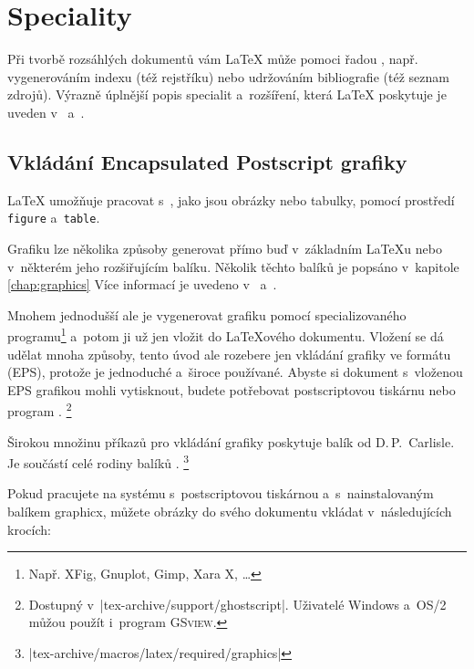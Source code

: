  
\chapter{Speciality}
\begin{intro}
  Při tvorbě rozsáhlých dokumentů vám \LaTeX{} může pomoci
  řadou , např. vygenerováním indexu (též rejstříku) nebo
  udržováním bibliografie (též seznam zdrojů). Výrazně úplnější popis specialit
  a~rozšíření, která \LaTeX{} poskytuje je uveden
v~{\normalfont\manual{}} a~{\normalfont \companion}.
\end{intro}

\section{Vkládání Encapsulated Postscript grafiky}\label{eps}
\LaTeX{} umožňuje pracovat s~, jako jsou
obrázky nebo tabulky, pomocí prostředí \texttt{figure}
a~\texttt{table}.

Grafiku lze několika způsoby generovat přímo buď
v~základním \LaTeX u nebo v~některém jeho rozšiřujícím
balíku. Několik těchto balíků je popsáno v~kapitole
\ref{chap:graphics} Více informací je uvedeno
v~\companion{} a~\manual{}.

Mnohem jednodušší ale je vygenerovat grafiku pomocí specializovaného
programu\footnote{Např. XFig, Gnuplot, Gimp, Xara X, \ldots} a~potom
ji už jen vložit do \LaTeX ového dokumentu. Vložení se dá udělat
mnoha způsoby, tento úvod ale rozebere jen vkládání grafiky ve formátu
\EPSi{} (EPS), protože je jednoduché a~široce používané. Abyste
si dokument s~vloženou EPS grafikou mohli vytisknout, budete
potřebovat postscriptovou tiskárnu nebo program \textsc{}.%
\footnote{Dostupný v~\CTANalt|tex-archive/support/ghostscript|. Uživatelé
Windows a~OS/2 můžou použít i~program \textsc{GSview}.}

Širokou množinu příkazů pro vkládání grafiky poskytuje balík
 od D.\,P.~Carlisle. Je součástí celé rodiny balíků
.%
\footnote{\CTANalt|tex-archive/macros/latex/required/graphics|}

Pokud pracujete na systému s~postscriptovou tiskárnou a~s~nainstalovaným
balíkem \textsf{graphicx}, můžete obrázky do svého dokumentu
vkládat v~následujících krocích:


